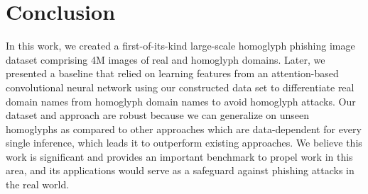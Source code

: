 \documentclass[letterpaper]{article} \usepackage{aaai22}  \usepackage{times}  \usepackage{helvet}  \usepackage{courier}  \usepackage[hyphens]{url}  \usepackage{graphicx} \urlstyle{rm} \def\UrlFont{\rm}  \usepackage{natbib}  \usepackage{caption} \DeclareCaptionStyle{ruled}{labelfont=normalfont,labelsep=colon,strut=off} \frenchspacing  \setlength{\pdfpagewidth}{8.5in}  \setlength{\pdfpageheight}{11in}  \usepackage{algorithm}
\begin{document}
\section{Conclusion}
In this work, we created a first-of-its-kind large-scale homoglyph phishing image dataset comprising 4M images of real and homoglyph domains. Later, we presented a baseline that relied on learning features from an attention-based convolutional neural network using our constructed data set to differentiate real domain names from homoglyph domain names to avoid homoglyph attacks. Our dataset and approach are robust because we can generalize on unseen homoglyphs as compared to other approaches which are data-dependent for every single inference, which leads it to outperform existing approaches. We believe this work is significant and provides an important benchmark to propel work in this area, and its applications would serve as a safeguard against phishing attacks in the real world. 


\end{document}
